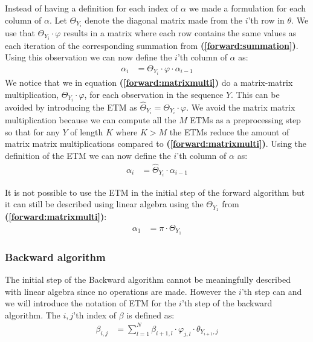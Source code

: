 Instead of having a definition for each index of $\alpha$ we made a formulation for each column of $\alpha$. Let $\Theta_{Y_i}$ denote the diagonal matrix made from the $i$'th row in $\theta$. We use that $\Theta_{Y_i}\cdot\varphi$ results in a matrix where each row contains the same values as each iteration of the corresponding summation from \textbf{(\ref{forward:summation})}. Using this observation we can now define the $i$'th column of $\alpha$ as: %
\begin{align}\label{forward:matrixmulti}
  \alpha_{i} &= \Theta_{Y_i}\cdot\varphi\cdot\alpha_{i-1}
\end{align}
We notice that we in equation \textbf{(\ref{forward:matrixmulti})} do a matrix-matrix multiplication, $\Theta_{Y_i}\cdot\varphi$, for each observation in the sequence $Y$. This can be avoided by introducing the ETM as $\hat{\Theta}_{Y_i} = \Theta_{Y_i}\cdot\varphi$. We avoid the matrix matrix multiplication because we can compute all the $ M $ ETMs as a preprocessing step so that for any $Y$ of length $K$ where $K>M$ the ETMs reduce the amount of matrix matrix multiplications compared to \textbf{(\ref{forward:matrixmulti})}. Using the definition of the ETM we can now define the $i$'th column of $\alpha$ as:
\begin{align}\label{forward:final}
  \alpha_i &= \hat{\Theta}_{Y_i}\cdot\alpha_{i-1}
\end{align}

It is not possible to use the ETM in the initial step of the forward algorithm but it can still be described using linear algebra using the $\Theta_{Y_{1}}$ from \textbf{(\ref{forward:matrixmulti})}:
\begin{align*}
  \alpha_{1} &= \pi\cdot\Theta_{Y_{1}}
\end{align*}

\subsubsection{Backward algorithm}

The initial step of the Backward algorithm cannot be meaningfully described with linear algebra since no operations are made. However the $i$'th step can and we will introduce the notation of ETM for the $i$'th step of the backward algorithm. The $i,j$'th index of $\beta$ is defined as:
\begin{align*}
  \beta_{i,j} &= \sum\limits_{l=1}^{N} \beta_{i+1,l}\cdot\varphi_{j,l}\cdot\theta_{Y_{i+1},j}
\end{align*}

